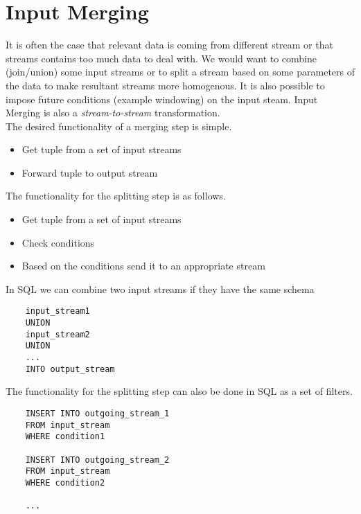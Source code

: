 \documentclass{article}
\begin{document}
\section{Input Merging}

It is often the case that relevant data is coming from different stream or that streams contains too much data to deal with. We would want to combine (join/union) some input streams or to split a stream based on some parameters of the data to make resultant streams more homogenous. It is also possible to impose future conditions (example windowing) on the input steam. Input Merging is also a \emph{stream-to-stream} transformation.
\\



The desired functionality of a merging step is simple.
\begin{itemize}
    \item Get tuple from a set of input streams
    \item Forward tuple to output stream
\end{itemize}

\noindent The functionality for the splitting step is as follows.

\begin{itemize}
    \item Get tuple from a set of input streams
    \item Check conditions
    \item Based on the conditions send it to an appropriate stream
\end{itemize}

\noindent In SQL we can combine two input streams if they have the same schema 

\begin{verbatim}   
    input_stream1
    UNION
    input_stream2
    UNION
    ...
    INTO output_stream
\end{verbatim}

\noindent The functionality for the splitting step can also be done in SQL as a set of filters. 

\begin{verbatim}   
    INSERT INTO outgoing_stream_1 
    FROM input_stream
    WHERE condition1
    
    INSERT INTO outgoing_stream_2
    FROM input_stream
    WHERE condition2
    
    ...
\end{verbatim}
\end{document}
